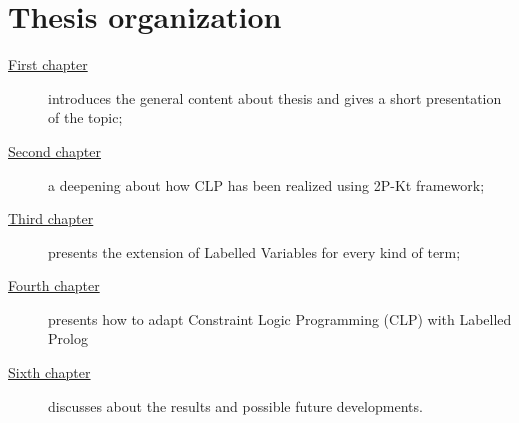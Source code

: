 \section{Thesis organization}\label{sec:thesis-organization}
\begin{description}
    \item[{\hyperref[ch:background-notions]{First chapter}}] introduces the general content about thesis and gives a short presentation of the topic;

    \item[{\hyperref[ch:clp_2p_kt]{Second chapter}}] a deepening about how CLP has been realized using 2P-Kt framework;

    \item[{\hyperref[ch:labelled_prolog]{Third chapter}}] presents the extension of Labelled Variables for every kind of term;

    \item[{\hyperref[ch:clp_labeled_prolog]{Fourth chapter}}] presents how to adapt Constraint Logic Programming (CLP) with Labelled Prolog

    \item[{\hyperref[ch:conclusions]{Sixth chapter}}] discusses about the results and possible future developments.
\end{description}